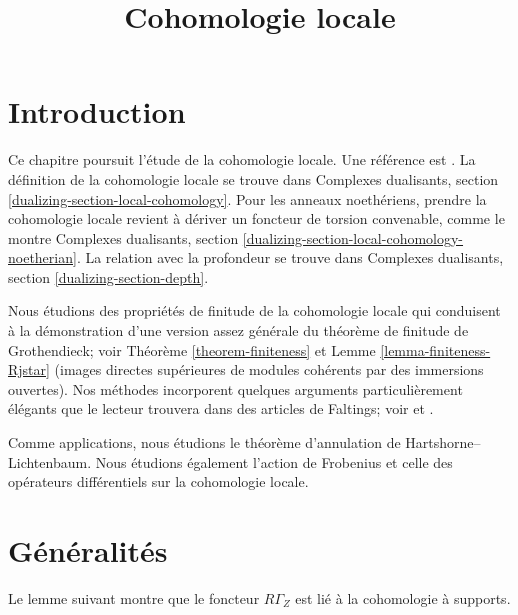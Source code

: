 

%


\title{Cohomologie locale}


\maketitle

\label{section-phantom}

\tableofcontents

\section{Introduction}
\label{section-introduction}

\noindent
Ce chapitre poursuit l'étude de la cohomologie locale.
Une référence est \cite{SGA2}.
La définition de la cohomologie locale se trouve dans
Complexes dualisants, section \ref{dualizing-section-local-cohomology}.
Pour les anneaux noethériens, prendre la cohomologie locale revient
à dériver un foncteur de torsion convenable, comme le montre
Complexes dualisants, section
\ref{dualizing-section-local-cohomology-noetherian}.
La relation avec la profondeur se trouve dans
Complexes dualisants, section
\ref{dualizing-section-depth}.

\medskip\noindent
Nous étudions des propriétés de finitude de la cohomologie locale qui conduisent
à la démonstration d'une version assez générale du
théorème de finitude de Grothendieck; voir Théorème \ref{theorem-finiteness}
et Lemme \ref{lemma-finiteness-Rjstar} (images directes supérieures
de modules cohérents par des immersions ouvertes).
Nos méthodes incorporent quelques arguments particulièrement élégants que le lecteur
trouvera dans des articles de Faltings; voir
\cite{Faltings-annulators} et \cite{Faltings-finiteness}.

\medskip\noindent
Comme applications, nous étudions le théorème d'annulation de
Hartshorne--Lichtenbaum. Nous étudions également
l'action de Frobenius et celle des opérateurs différentiels
sur la cohomologie locale.




\section{Généralités}
\label{section-generalities}

\noindent
Le lemme suivant montre que le foncteur $R\Gamma_Z$
est lié à la cohomologie à supports.

